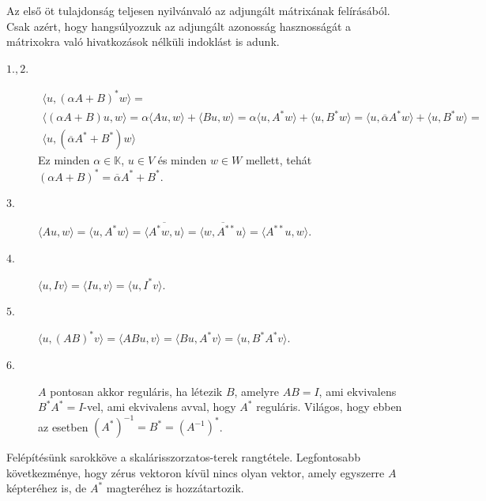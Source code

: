 \documentclass[a4paper, showtrims]{memoir}
\makeatletter
\renewenvironment{proof}[1][\proofname]
    {\par\pushQED{\qed}%
    \normalfont \topsep6\p@\@plus6\p@\relax
    \trivlist
    \item[\hskip\labelsep
        \itshape
    #1\@addpunct{:}]\ignorespaces}
    {\popQED\endtrivlist\@endpefalse}
\theoremstyle{plain}
\theoremstyle{remark}
\theoremstyle{definition}
\newcommand{\ip}[2]{\langle#1,#2\rangle}
\makeatother
\begin{document}
\begin{proof}
	Az első öt tulajdonság teljesen nyilvánvaló az adjungált mátrixának felírásából.
	Csak azért, hogy hangsúlyozzuk az adjungált azonosság hasznosságát a mátrixokra való hivatkozások nélküli indoklást is adunk.
	\begin{description}
		\item[$1., 2.$ ]
		      \begin{multline*}
			      \ip{u}{(\alpha A+B)^\ast w}
			      =\\
			      \ip{\left( \alpha A+B \right)u}{w}
			      =
			      \alpha\ip{Au}{w}+\ip{Bu}{w}
			      =
			      \alpha\ip{u}{A^\ast w}+\ip{u}{B^\ast w}
			      =
			      \ip{u}{\overline{\alpha}A^\ast w}+\ip{u}{B^\ast w}
			      =\\
			      \ip{u}{\left( \overline{\alpha}A^\ast +B^\ast \right)w}
		      \end{multline*}
		      Ez minden $\alpha\in\mathbb{K}$, $u\in V$ és minden $w\in W$ mellett, tehát
		      \begin{math}
			      \left( \alpha A+B \right)^\ast=\overline{\alpha}A^\ast+B^\ast.
		      \end{math}
		\item[$3.$]
		      \(
		      \ip{Au}{w}
		      =
		      \ip{u}{A^\ast w}
		      =
		      \overline{
			      \ip{A^\ast w}{u}
		      }
		      =
		      \overline{
			      \ip{w}{A^{\ast\ast} u}
		      }
		      =
		      \ip{A^{\ast\ast} u}{w}.
		      \)
		\item[$4.$]
		      \(
		      \ip{u}{Iv}
		      =
		      \ip{Iu}{v}
		      =
		      \ip{u}{I^\ast v}.
		      \)
		\item[$5.$]
		      \begin{math}
			      \ip{u}{\left( AB \right)^\ast v}
			      =
			      \ip{ABu}{v}
			      =
			      \ip{Bu}{A^\ast v}
			      =
			      \ip{u}{B^\ast A^\ast v}.
		      \end{math}
		\item[$6.$] $A$ pontosan akkor reguláris, ha létezik $B$, amelyre $AB=I$, ami ekvivalens $B^\ast A^\ast=I$-vel,
		      ami ekvivalens avval, hogy $A^\ast$ reguláris.
		      Világos, hogy ebben az esetben $\left( A^\ast \right)^{-1}=B^\ast=\left( A^{-1} \right)^\ast$.
		      \qedhere
	\end{description}
\end{proof}
Felépítésünk sarokköve a skalárisszorzatos-terek rangtétele.
Legfontosabb következménye, hogy zérus vektoron kívül nincs olyan vektor,
amely egyszerre $A$ képteréhez is, de $A^\ast$ magteréhez is hozzátartozik.
\end{document}
